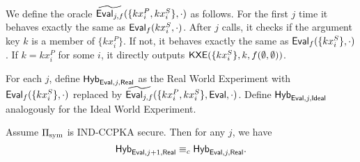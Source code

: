 \begin{definition}
We define the oracle $\widetilde{\mathsf{Eval}_{j, f}}(\{kx_i^P, kx_i^S\}, \cdot)$ as follows. For the first $j$ time it behaves exactly the same as $\mathsf{Eval}_f(kx_i^S, \cdot)$. After $j$ calls, it checks if the argument key $k$ is a member of $\{kx_i^P\}$. If not, it behaves exactly the same as $\mathsf{Eval}_f(\{kx_i^S\}, \cdot)$. If $k = kx_i^P$ for some $i$, it directly outputs $\mathsf{KXE}(\{kx_i^S\}, k, f(\emptyset, \emptyset))$.

    For each $j$, define $\mathsf{Hyb}_{\mathsf{Eval}, j, \mathsf{Real}}$ as the Real World Experiment with $\mathsf{Eval}_f(\{kx_i^S\}, \cdot)$ replaced by $\widetilde{\mathsf{Eval}_{j, f}}(\{kx_i^P, kx_i^S\}, \mathsf{Eval}, \cdot)$. Define $\mathsf{Hyb}_{\mathsf{Eval}, j, \mathsf{Ideal}}$ analogously for the Ideal World Experiment. 
\end{definition}
\begin{lemma}
     Assume $\Pi_{\text{sym}}$ is IND-CCPKA secure. Then for any $j$, we have 
    $$\mathsf{Hyb}_{\mathsf{Eval}, j + 1, \mathsf{Real}} \equiv_c \mathsf{Hyb}_{\mathsf{Eval}, j, \mathsf{Real}}.$$
\end{lemma}
